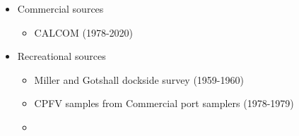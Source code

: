 \documentclass[11pt,
  english,
  a4paper,
]{article}
\begin{document}
\begin{itemize}
\item

  Commercial sources

  \tagmcend\tagstructend\tagstructend


  \begin{itemize}
  \item


    CALCOM (1978-2020)

    \tagmcend\tagstructend\tagstructend

    \tagmcend\tagstructend\tagstructend
  \end{itemize}

  \tagstructend
\item

  Recreational sources

  \tagmcend\tagstructend\tagstructend


  \begin{itemize}
  \item


    Miller and Gotshall dockside survey (1959-1960)

    \tagmcend\tagstructend\tagstructend

    \tagmcend\tagstructend\tagstructend
  \item


    CPFV samples from Commercial port samplers (1978-1979)

    \tagmcend\tagstructend\tagstructend

    \tagmcend\tagstructend\tagstructend
  \item


\end{itemize}
\end{itemize}
\end{document}
